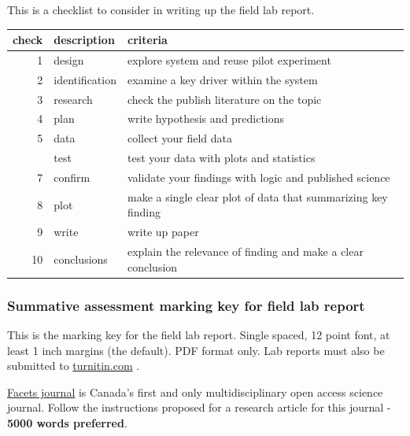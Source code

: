 \documentclass[
]{book}
\begin{document}
This is a checklist to consider in writing up the field lab report.

\begin{tabular}{rll}
\toprule
check & description & criteria\\
\midrule
1 & design & explore system and reuse pilot experiment\\
2 & identification & examine a key driver within the system\\
3 & research & check the publish literature on the topic\\
4 & plan & write hypothesis and predictions\\
5 & data & collect your field data\\
\addlinespace
6 & test & test your data with plots and statistics\\
7 & confirm & validate your findings with logic and published science\\
8 & plot & make a single clear plot of data that summarizing key finding\\
9 & write & write up paper\\
10 & conclusions & explain the relevance of finding and make a clear conclusion\\
\bottomrule
\end{tabular}

\hypertarget{summative-assessment-marking-key-for-field-lab-report}{%
\subsubsection*{Summative assessment marking key for field lab report}\label{summative-assessment-marking-key-for-field-lab-report}}

This is the marking key for the field lab report. Single spaced, 12 point font, at least 1 inch margins (the default). PDF format only. Lab reports must also be submitted to \href{https://www.turnitin.com}{turnitin.com} .

\href{https://www.facetsjournal.com/authors/instructions/}{Facets journal} is Canada's first and only multidisciplinary open access science journal. Follow the instructions proposed for a research article for this journal - \textbf{5000 words preferred}.
\end{document}
